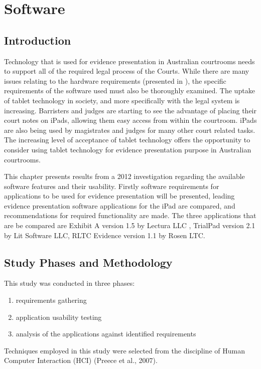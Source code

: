 


\chapter{Software\label{chap:Software}}


\section{Introduction}
\doublespace
Technology that is used for evidence presentation in Australian courtrooms needs to support all of the required legal process of the Courts. While there are many issues relating to the hardware requirements (presented in 
 ), the specific requirements of the software used must also be thoroughly examined. The uptake of tablet technology in society, and more specifically with the legal system is increasing.
Barristers and judges are starting to see the advantage of placing their court notes on iPads, allowing them easy access from within the courtroom. iPads are also being used by magistrates and judges for many other court related tasks. The increasing level of acceptance of tablet technology offers the opportunity to consider using tablet technology for evidence presentation purpose in Australian courtrooms.

This chapter presents results from a 2012 investigation regarding the available software features and their usability.
Firstly software requirements for applications to be used for evidence presentation will be presented, leading evidence presentation software applications for the iPad  are compared, and recommendations for required functionality are made.
The three applications that are be compared are Exhibit A version 1.5 by Lectura LLC ,  TrialPad version 2.1 by Lit Software LLC, RLTC Evidence version 1.1 by Rosen LTC.


\section{Study Phases and Methodology}
This study was conducted in three phases:
\begin{enumerate}
    \item requirements gathering
    \item application usability testing
    \item analysis of the applications against identified requirements
\end{enumerate} 
Techniques employed in this study were selected from the discipline of Human Computer Interaction (HCI) \color{green}(Preece et al., 2007).
\color{black}

